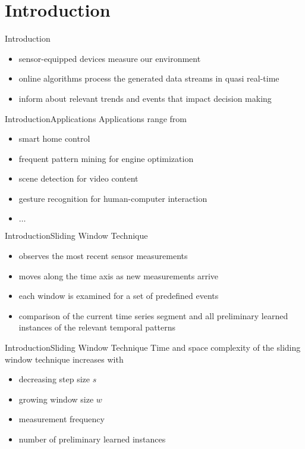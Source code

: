 \section{Introduction}
\begin{frame}{Introduction}
    \begin{itemize}
        \item sensor-equipped devices measure our environment
        \pause
        \item online algorithms process the generated data streams in quasi real-time
        \pause
        \item inform about relevant trends and events that impact decision making
    \end{itemize}
\end{frame}

\begin{frame}{Introduction}{Applications}
    Applications range from
    \begin{itemize}
        \item smart home control \cite{spiegel2015metering}
        \pause
        \item frequent pattern mining for engine optimization \cite{spiegel2015driving}
        \pause
        \item scene detection for video content \cite{acar2011mediaeval}
        \pause
        \item gesture recognition for human-computer interaction \cite{liu2009uwave}
        \pause
        \item $\dots$
    \end{itemize}
\end{frame}

\begin{frame}{Introduction}{Sliding Window Technique}
    \begin{itemize}
        \item observes the most recent sensor measurements
        \pause
        \item moves along the time axis as new measurements arrive
        \pause
        \item each window is examined for a set of predefined events
        \pause
        \item comparison of the current time series segment and all preliminary learned instances of the relevant temporal patterns
    \end{itemize}
\end{frame}

\begin{frame}{Introduction}{Sliding Window Technique}
    Time and space complexity of the sliding window technique increases with
    \begin{itemize}
        \item decreasing step size $s$
        \pause
        \item growing window size $w$
        \pause
        \item measurement frequency
        \pause
        \item number of preliminary learned instances
    \end{itemize}
\end{frame}

